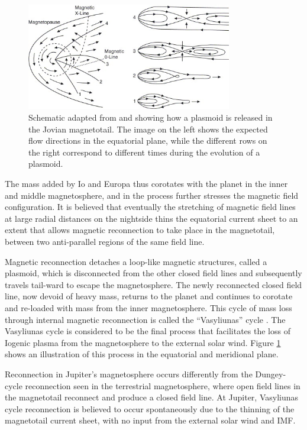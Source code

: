 \begin{figure}
    \centering
    \includegraphics[width=0.8\textwidth]{images1/chp1-vasyliunas-cycle.jpg}
    \caption{Schematic adapted from \protect{} and \protect{} showing how a plasmoid is released in the Jovian magnetotail. The image on the left shows the expected flow directions in the equatorial plane, while the different rows on the right correspond to different times during the evolution of a plasmoid.}
    \label{fig:vasyliunas-cycle}
\end{figure}

The mass added by Io and Europa thus corotates with the planet in the inner and middle magnetosphere, and in the process further stresses the magnetic field configuration. It is believed that eventually the stretching of magnetic field lines at large radial distances on the nightside thins the equatorial current sheet to an extent that allows magnetic reconnection to take place in the magnetotail, between two anti-parallel regions of the same field line. 

Magnetic reconnection detaches a loop-like magnetic structures, called a plasmoid, which is disconnected from the other closed field lines and subsequently travels tail-ward to escape the magnetosphere. The newly reconnected closed field line, now devoid of heavy mass, returns to the planet and continues to corotate and re-loaded with mass from the inner magnetosphere. This cycle of mass loss through internal magnetic reconnection is called the ``Vasyliunas'' cycle \cite{Vasyliunas1983a}. The Vasyliunas cycle is considered to be the final process that facilitates the loss of Iogenic plasma from the magnetosphere to the external solar wind. Figure \ref{fig:vasyliunas-cycle} shows an illustration of this process in the equatorial and meridional plane. 

Reconnection in Jupiter's magnetosphere occurs differently from the Dungey-cycle reconnection seen in the terrestrial magnetosphere, where open field lines in the magnetotail reconnect and produce a closed field line. At Jupiter, Vasyliunas cycle reconnection is believed to occur spontaneously due to the thinning of the magnetotail current sheet, with no input from the external solar wind and IMF.  

